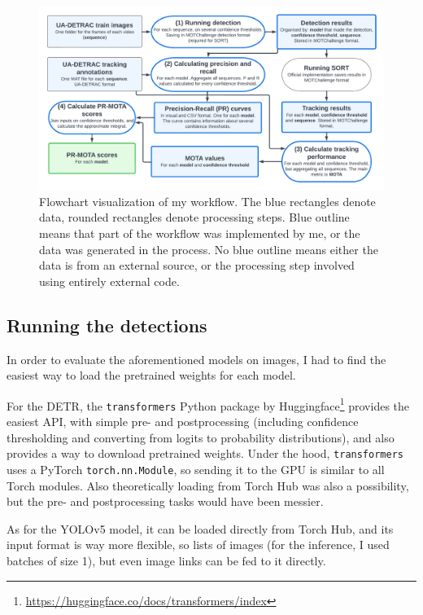 \begin{figure}[h]
    \captionsetup{width=\textwidth}
    \includegraphics[width=\textwidth]{figures/workflow.pdf}
    \caption{Flowchart visualization of my workflow. The blue rectangles denote data, rounded rectangles denote processing steps. Blue outline means that part of the workflow was implemented by me, or the data was generated in the process. No blue outline means either the data is from an external source, or the processing step involved using entirely external code.}
    \label{fig:workflow}
\end{figure}

\subsection{Running the detections}

In order to evaluate the aforementioned models on images, I had to find the easiest way to load the pretrained weights for each model.

For the DETR, the \verb|transformers| Python package by Huggingface\footnote{\url{https://huggingface.co/docs/transformers/index}} provides the easiest API, with simple pre- and postprocessing (including confidence thresholding and converting from logits to probability distributions), and also provides a way to download pretrained weights. Under the hood, \verb|transformers| uses a PyTorch \verb|torch.nn.Module|, so sending it to the GPU is similar to all Torch modules. Also theoretically loading from Torch Hub was also a possibility, but the pre- and postprocessing tasks would have been messier.

As for the YOLOv5 model, it can be loaded directly from Torch Hub, and its input format is way more flexible, so lists of images (for the inference, I used batches of size 1), but even image links can  be fed to it directly.

